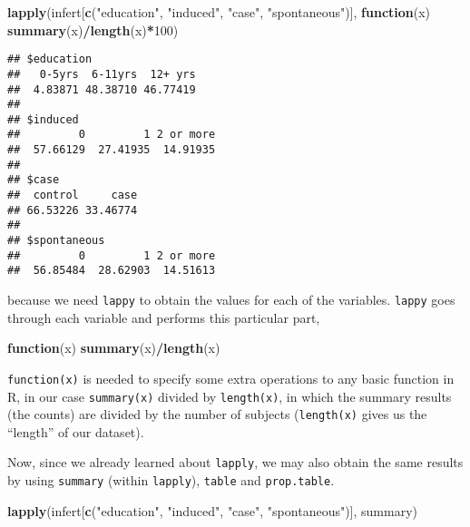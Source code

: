 \documentclass[]{book}
\newenvironment{Shaded}{\begin{snugshade}}{\end{snugshade}}
\newcommand{\KeywordTok}[1]{\textcolor[rgb]{0.13,0.29,0.53}{\textbf{#1}}}
\newcommand{\DecValTok}[1]{\textcolor[rgb]{0.00,0.00,0.81}{#1}}
\newcommand{\StringTok}[1]{\textcolor[rgb]{0.31,0.60,0.02}{#1}}
\newcommand{\ControlFlowTok}[1]{\textcolor[rgb]{0.13,0.29,0.53}{\textbf{#1}}}
\newcommand{\OperatorTok}[1]{\textcolor[rgb]{0.81,0.36,0.00}{\textbf{#1}}}
\newcommand{\NormalTok}[1]{#1}
\theoremstyle{definition}
\theoremstyle{definition}
\theoremstyle{remark}
\begin{document}
\begin{Shaded}
\begin{Highlighting}[]
\KeywordTok{lapply}\NormalTok{(infert[}\KeywordTok{c}\NormalTok{(}\StringTok{"education"}\NormalTok{, }\StringTok{"induced"}\NormalTok{, }\StringTok{"case"}\NormalTok{, }\StringTok{"spontaneous"}\NormalTok{)], }\ControlFlowTok{function}\NormalTok{(x) }\KeywordTok{summary}\NormalTok{(x)}\OperatorTok{/}\KeywordTok{length}\NormalTok{(x)}\OperatorTok{*}\DecValTok{100}\NormalTok{)}
\end{Highlighting}
\end{Shaded}

\begin{verbatim}
## $education
##   0-5yrs  6-11yrs  12+ yrs 
##  4.83871 48.38710 46.77419 
## 
## $induced
##         0         1 2 or more 
##  57.66129  27.41935  14.91935 
## 
## $case
##  control     case 
## 66.53226 33.46774 
## 
## $spontaneous
##         0         1 2 or more 
##  56.85484  28.62903  14.51613
\end{verbatim}

because we need \texttt{lappy} to obtain the values for each of the
variables. \texttt{lappy} goes through each variable and performs this
particular part,

\begin{Shaded}
\begin{Highlighting}[]
\ControlFlowTok{function}\NormalTok{(x) }\KeywordTok{summary}\NormalTok{(x)}\OperatorTok{/}\KeywordTok{length}\NormalTok{(x)}
\end{Highlighting}
\end{Shaded}

\texttt{function(x)} is needed to specify some extra operations to any
basic function in R, in our case \texttt{summary(x)} divided by
\texttt{length(x)}, in which the summary results (the counts) are
divided by the number of subjects (\texttt{length(x)} gives us the
``length'' of our dataset).

Now, since we already learned about \texttt{lapply}, we may also obtain
the same results by using \texttt{summary} (within \texttt{lapply}),
\texttt{table} and \texttt{prop.table}.

\begin{Shaded}
\begin{Highlighting}[]
\KeywordTok{lapply}\NormalTok{(infert[}\KeywordTok{c}\NormalTok{(}\StringTok{"education"}\NormalTok{, }\StringTok{"induced"}\NormalTok{, }\StringTok{"case"}\NormalTok{, }\StringTok{"spontaneous"}\NormalTok{)], summary)}
\end{Highlighting}
\end{Shaded}
\end{document}
